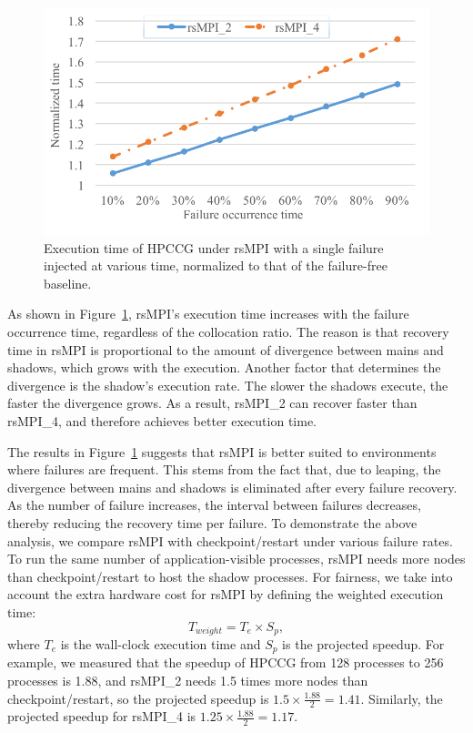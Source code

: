 \begin{figure}[!t]
  \begin{center}
      \includegraphics[width=0.6\columnwidth]{Figures/single_failure_srmpi}
  \end{center}
  \vskip -0.2in
  \caption{Execution time of HPCCG under rsMPI with a single failure injected at various time, normalized to that of the failure-free baseline.}
  \label{fig:single_failure}
\end{figure}

As shown in Figure~\ref{fig:single_failure}, rsMPI's execution time increases with the failure occurrence time, regardless of the collocation ratio. The reason is that recovery time in rsMPI is proportional to the amount of divergence between mains and shadows, which grows with the execution. 
Another factor that determines the divergence is the shadow's execution rate. The slower the shadows execute, the faster the divergence grows. As a result, rsMPI\_2 can recover faster than rsMPI\_4, and therefore achieves better execution time.



The results in Figure~\ref{fig:single_failure} suggests that rsMPI is better suited to environments where failures are frequent. 
This stems from the fact that, due to leaping, the divergence between mains and shadows is eliminated after every failure recovery. As the number of failure increases, the interval between failures decreases, thereby reducing the recovery time per failure.
To demonstrate the above analysis, we compare rsMPI with checkpoint/restart under various failure rates. 
To run the same number of application-visible processes, rsMPI needs more nodes than checkpoint/restart to host the shadow processes. 
For fairness, we take into account the extra hardware cost for rsMPI by defining the weighted execution time:
$$T_{weight} = T_e \times S_p,$$ where $T_e$ is the wall-clock execution time and $S_p$ is the projected speedup. For example, we measured that the speedup of HPCCG from 128 processes to 256 processes is 1.88, and rsMPI\_2 needs 1.5 times more nodes than checkpoint/restart, so the projected speedup is $1.5\times\frac{1.88}{2}=1.41$. Similarly, the projected speedup for rsMPI\_4 is $1.25\times\frac{1.88}{2}=1.17$.


